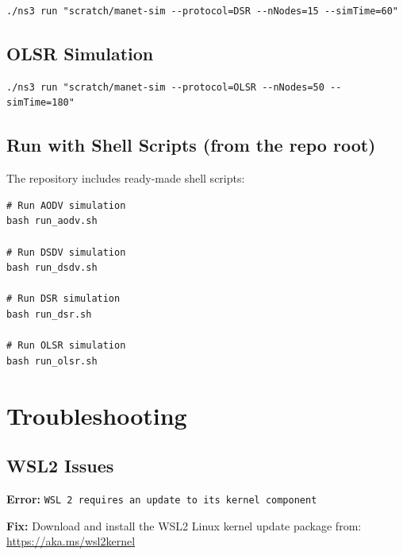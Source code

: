 \documentclass[12pt,a4paper]{article}
\newenvironment{errorbox}
  {\begin{tcolorbox}[
      colback   = dangered!8,
      colframe  = dangered,
      fonttitle = \bfseries,
      title     = \textcolor{dangered}{$\times$\; Error / Fix},
      breakable
  ]}
  {\end{tcolorbox}}
\begin{document}
\begin{lstlisting}[style=bash, caption={Run DSR simulation}]
./ns3 run "scratch/manet-sim --protocol=DSR --nNodes=15 --simTime=60"
\end{lstlisting}

\subsection{OLSR Simulation}

\begin{lstlisting}[style=bash, caption={Run OLSR simulation}]
./ns3 run "scratch/manet-sim --protocol=OLSR --nNodes=50 --simTime=180"
\end{lstlisting}

\subsection{Run with Shell Scripts (from the repo root)}

The repository includes ready-made shell scripts:

\begin{lstlisting}[style=bash, caption={Run pre-configured simulations from repo root}]
# Run AODV simulation
bash run_aodv.sh

# Run DSDV simulation
bash run_dsdv.sh

# Run DSR simulation
bash run_dsr.sh

# Run OLSR simulation
bash run_olsr.sh
\end{lstlisting}


\section{Troubleshooting}

\subsection{WSL2 Issues}

\begin{errorbox}
\textbf{Error:} \texttt{WSL 2 requires an update to its kernel component}

\textbf{Fix:} Download and install the WSL2 Linux kernel update package from:\\
\url{https://aka.ms/wsl2kernel}
\end{errorbox}
\end{document}
